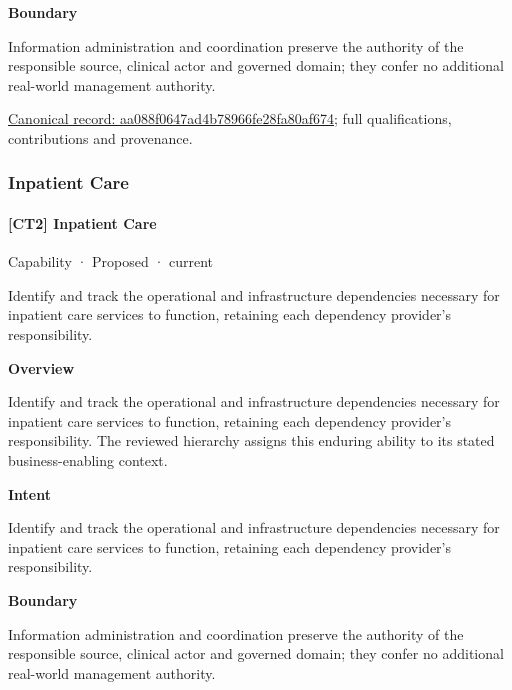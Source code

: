 \textbf{Boundary}



Information administration and coordination preserve the authority of the responsible source, clinical actor and governed domain; they confer no additional real-world management authority.


{\footnotesize \href{../../../../continuum/strategy/capability/aa088f0647ad4b78966fe28fa80af674.md}{Canonical record: aa088f0647ad4b78966fe28fa80af674}; full qualifications, contributions and provenance.}\par
\subsubsection{Inpatient Care}

\paragraph{[CT2] Inpatient Care}

\label{element:b39fb49c01b545a5b51d3313531efb1b}
{\small Capability · Proposed · current}\par

Identify and track the operational and infrastructure dependencies necessary for inpatient care services to function, retaining each dependency provider's responsibility.



\textbf{Overview}



Identify and track the operational and infrastructure dependencies necessary for inpatient care services to function, retaining each dependency provider's responsibility. The reviewed hierarchy assigns this enduring ability to its stated business-enabling context.



\textbf{Intent}



Identify and track the operational and infrastructure dependencies necessary for inpatient care services to function, retaining each dependency provider's responsibility.



\textbf{Boundary}



Information administration and coordination preserve the authority of the responsible source, clinical actor and governed domain; they confer no additional real-world management authority.


